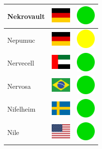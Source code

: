 \documentclass[12pt, a4paper, twoside]{report}
\begin{document}
\begin{center}
\begin{longtable}{|p{5cm}|p{2cm}|p{2cm}|}
 Nekrovault                                                 & \includegraphics[width=1cm]{4x3/de} &   \includegraphics[width=1cm]{likes/y} \\ \hline
 Nepumuc                                                    & \includegraphics[width=1cm]{4x3/de} &   \includegraphics[width=1cm]{likes/m} \\ \hline
 Nervecell                                                  & \includegraphics[width=1cm]{4x3/ae} &   \includegraphics[width=1cm]{likes/y} \\ \hline
 Nervosa                                                    & \includegraphics[width=1cm]{4x3/br} &   \includegraphics[width=1cm]{likes/y} \\ \hline
 Nifelheim                                                  & \includegraphics[width=1cm]{4x3/se} &   \includegraphics[width=1cm]{likes/y} \\ \hline
 Nile                                                       & \includegraphics[width=1cm]{4x3/us} &   \includegraphics[width=1cm]{likes/y} \\ \hline

\end{longtable}
\end{center}
\end{document}
